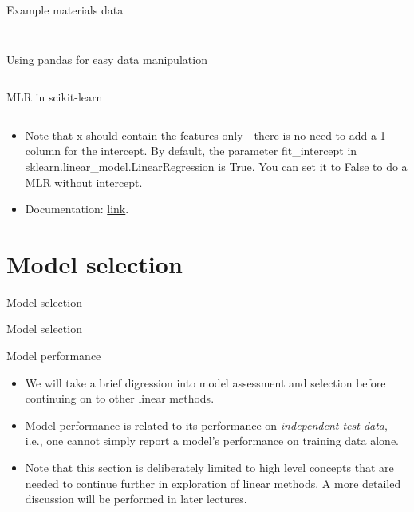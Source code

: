 \documentclass[aspectratio=169]{beamer}
\begin{document}
\begin{frame}{Example materials data}
\begin{columns}
\begin{column}{0.3\textwidth}
\begin{figure}
    \end{figure}
    \end{column}
\end{columns}
\end{frame} 


\begin{frame}[fragile]{Using pandas for easy data manipulation}
    \inputminted{python}{example_pandas_data_manipulation.py}
\end{frame} 


\begin{frame}[fragile]{MLR in scikit-learn}
\inputminted{python}{example_sklearn_mlr.py}
\begin{itemize}
    \item Note that x should contain the features only - there is no need to add a 1 column for the intercept. By default, the parameter fit\_intercept in sklearn.linear\_model.LinearRegression is True. You can set it to False to do a MLR without intercept.
    \item Documentation: \href{https://scikit-learn.org/stable/modules/generated/sklearn.linear_model.LinearRegression.html}{link}.
\end{itemize}

\end{frame} 


\section{Model selection}

\begin{frame}{Model selection}
    \Huge{\centerline{Model selection}}
\end{frame} 


\begin{frame}{Model performance}
    \begin{itemize}
        \item We will take a brief digression into model assessment and selection before continuing on to other linear methods.
        \item Model performance is related to its performance on \textit{independent test data}, i.e., one cannot simply report a model's performance on training data alone.
        \item Note that this section is deliberately limited to high level concepts that are needed to continue further in exploration of linear methods. A more detailed discussion will be performed in later lectures.
    \end{itemize}
\end{frame} 
\end{document}
